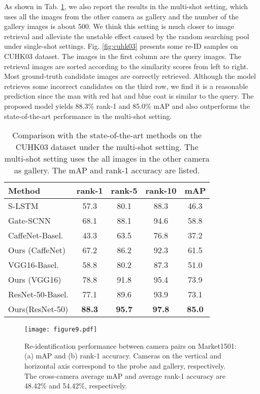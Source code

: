 \documentclass[journal]{IEEEtran}
\begin{document}
As shown in Tab. \ref{table:multi}, we also report the results in the multi-shot setting, which uses all the images from the other camera as gallery and the number of the gallery images is about 500. We think this setting is much closer to image retrieval and alleviate the unstable effect caused by the random searching pool under single-shot settings. Fig. \ref{fig:cuhk03} presents some re-ID samples on CUHK03 dataset. The images in the first column are the query images. The retrieval images are sorted according to the similarity scores from left to right. Most ground-truth candidate images are correctly retrieved. Although the model retrieves some incorrect candidates on the third row, we find it is a reasonable prediction since the man with red hat and blue coat is similar to the query. The proposed model yields 88.3\% rank-1 and 85.0\% mAP and also outperforms the state-of-the-art performance in the multi-shot setting.


\begin{table}
\begin{center}
\begin{tabular}{l|c|c|c|c}
\hline
Method & rank-1 & rank-5 & rank-10 & mAP\\
\hline
S-LSTM \cite{varior2016siamese} & 57.3 & 80.1 & 88.3 & 46.3 \\
Gate-SCNN \cite{varior2016gated} & 68.1 & 88.1 & 94.6 & 58.8\\
\hline\hline
CaffeNet-Basel. & 43.3 & 63.5 & 76.8 & 37.2 \\
Ours (CaffeNet) & 67.2 & 86.2 & 92.3 & 61.5 \\
\hline
VGG16-Basel. & 58.8 & 80.2 & 87.3 & 51.0 \\
Ours (VGG16) & 78.8 & 91.8 & 95.4 & 73.9 \\
\hline
ResNet-50-Basel. & 77.1 & 89.6 & 93.9 & 73.1 \\
Ours(ResNet-50) & \textbf{88.3} & \textbf{95.7} & \textbf{97.8} & \textbf{85.0}\\
\hline
\end{tabular}
\end{center}
\caption{Comparison with the state-of-the-art methods on the CUHK03 dataset under the multi-shot setting. The multi-shot setting uses the all images in the other camera as gallery. The mAP and rank-1 accuracy are listed.}
\label{table:multi}
\end{table}

\begin{figure}[t]
\begin{center}
\texttt{[image: figure9.pdf]}
\end{center}
   \caption{Re-identification performance between camera pairs on Market1501: (a) mAP and (b) rank-1 accuracy. Cameras on the vertical and horizontal axis correspond to the probe and gallery, respectively. The cross-camera average mAP and average rank-1 accuracy are 48.42\% and 54.42\%, respectively.}
\label{fig:camera}
\label{fig:onecol}
\end{figure}
\end{document}
